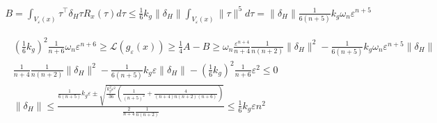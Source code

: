 \begin{align*}
    B = \int_{V_{\varepsilon}(x)}\tau^\top\delta_H\tau  R_x(\tau)d\tau \leq \frac{1}{6}k_g\|\delta_H\|\int_{V_{\varepsilon}(x)}\|\tau\|^5d\tau = \|\delta_H\|\tfrac{1}{6(n+5)}k_g\omega_n\varepsilon^{n+5}
\end{align*}

\begin{align*}
  &\left( \tfrac{1}{6} k_g \right)^2 \tfrac{1}{n+6}\omega_n \varepsilon^{n+6}  \geq \mathcal{L}(g_{\varepsilon}(x)) \geq \frac{1}{4}A - B \geq  \omega_n \frac{\varepsilon^{n+4}}{n+4}\frac{1}{n(n+2)} \|\delta_H\|^2 - \tfrac{1}{6(n+5)}k_g\omega_n\varepsilon^{n+5}\|\delta_H\|\\
 & \frac{1}{n+4}\frac{1}{n(n+2)} \|\delta_H\|^2 - \tfrac{1}{6(n+5)}k_g\varepsilon\|\delta_H\| - \left( \tfrac{1}{6} k_g \right)^2 \tfrac{1}{n+6} \varepsilon^{2} \leq 0 \\
 & \|\delta_H\| \leq \frac{\frac{1}{6(n+5)} k_g \varepsilon \pm \sqrt{\frac{k_g^2 \varepsilon^2}{36} \left(\frac{1}{(n+5)^2} + \frac{4}{(n+4)n(n+2)(n+6)}\right)}}{\frac{2}{n+4} \frac{1}{n(n+2)}} \leq \tfrac{1}{6}k_g \varepsilon n^2
\end{align*}

